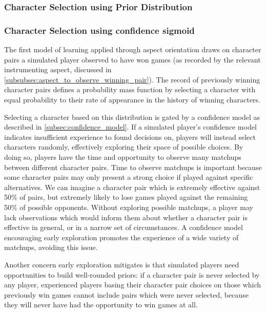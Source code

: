 \subsubsection{Character Selection using Prior Distribution}


\subsubsection{Character Selection using confidence sigmoid}\label{subsubsec:learning_by_picking_from_distribution_of_wins_with_confidence}

The first model of learning applied through aspect orientation draws on
character pairs a simulated player observed to have won games (as recorded by
the relevant instrumenting aspect, discussed in
\cref{subsubsec:aspect_to_observe_winning_pair}). The record of previously
winning character pairs defines a probability mass function by selecting a
character with equal probability to their rate of appearance in the history of
winning characters.

Selecting a character based on this distribution is gated by a confidence model
as described in \cref{subsec:confidence_model}. If a simulated player's
confidence model indicates insufficient experience to found decisions on,
players will instead select characters randomly, effectively exploring their
space of possible choices. By doing so, players have the time and opportunity to
observe many matchups between different character pairs. Time to observe
matchups is important because some character pairs may only present a strong
choice if played against specific alternatives. We can imagine a character pair
which is extremely effective against 50\% of pairs, but extremely likely to lose
games played against the remaining 50\% of possible opponents. Without exploring
possible matchups, a player may lack observations which would inform them about
whether a character pair is effective in general, or in a narrow set of
circumstances. A confidence model encouraging early exploration promotes the
experience of a wide variety of matchups, avoiding this issue.

Another concern early exploration mitigates is that simulated players need
opportunities to build well-rounded priors: if a character pair is never
selected by any player, experienced players basing their character pair choices
on those which previously win games cannot include pairs which were never
selected, because they will never have had the opportunity to win games at all.

